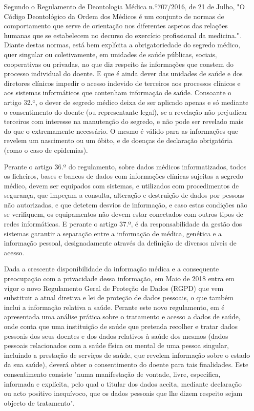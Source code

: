 \documentclass[conference]{IEEEtran}
\begin{document}
Segundo o Regulamento de Deontologia Médica n.º707/2016, de 21 de Julho, "O Código Deontológico da Ordem dos Médicos é um conjunto de normas de comportamento que serve de orientação nos diferentes aspetos das relações humanas que se estabelecem no decurso do exercício profissional da medicina.". Diante destas normas, está bem explícita a obrigatoriedade do segredo médico, quer singular ou coletivamente, em unidades de saúde públicas, sociais, cooperativas ou privadas, no que diz respeito às informações que constem do processo individual do doente. E que é ainda dever das unidades de saúde e dos diretores clínicos impedir o acesso indevido de terceiros aos processos clínicos e aos sistemas informáticos que contenham informação de saúde.
Consoante o artigo 32.º, o dever de segredo médico deixa de ser aplicado apenas e só mediante o consentimento do doente (ou representante legal), se a revelação não prejudicar terceiros com interesse na manutenção do segredo, e não pode ser revelado mais do que o extremamente necessário. O mesmo é válido para as informações que revelem um nascimento ou um óbito, e de doenças de declaração obrigatória (como o caso de epidemias).

Perante o artigo 36.º do regulamento, sobre dados médicos informatizados, todos os ficheiros, bases e bancos de dados com informações clínicas sujeitas a segredo médico, devem ser equipados com sistemas, e utilizados com procedimentos de segurança, que impeçam a consulta, alteração e destruição de dados por pessoas não autorizadas, e que detetem desvios de informação, e caso estas condições não se verifiquem, os equipamentos não devem estar conectados com outros tipos de redes informáticas. E perante o artigo 37.º, é da responsabilidade da gestão dos sistemas garantir a separação entre a informação de médica, genética e a informação pessoal, designadamente através da definição de diversos níveis de acesso. 

Dada a crescente disponibilidade da informação médica e a consequente preocupação com a privacidade dessa informação, em Maio de 2018 entra em vigor o novo Regulamento Geral de Proteção de Dados (RGPD) que vem substituir a atual diretiva e lei de proteção de dados pessoais, o que também inclui a informação relativa a saúde. Perante este novo regulamento, em \cite{rgpd2018} é apresentada uma análise prática sobre o tratamento e acesso a dados de saúde, onde conta que uma instituição de saúde que pretenda recolher e tratar dados pessoais dos seus doentes e dos dados relativos à saúde dos mesmos (dados pessoais relacionados com a saúde física ou mental de uma pessoa singular, incluindo a prestação de serviços de saúde, que revelem informação sobre o estado da sua saúde), deverá obter o consentimento do doente para tais finalidades. Este consentimento consiste "numa manifestação de vontade, livre, específica, informada e explícita, pelo qual o titular dos dados aceita, mediante declaração ou acto positivo inequívoco, que os dados pessoais que lhe dizem respeito sejam objecto de tratamento".
\end{document}
